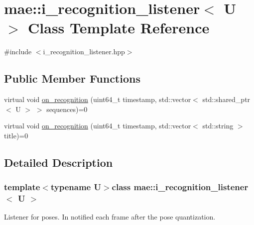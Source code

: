 \hypertarget{classmae_1_1i__recognition__listener}{\section{mae\-:\-:i\-\_\-recognition\-\_\-listener$<$ U $>$ Class Template Reference}
\label{classmae_1_1i__recognition__listener}
}


{\ttfamily \#include $<$i\-\_\-recognition\-\_\-listener.\-hpp$>$}

\subsection*{Public Member Functions}
\begin{DoxyCompactItemize}
\item 
virtual void \hyperlink{classmae_1_1i__recognition__listener_ace61997e2a43a260662c817674650a4a}{on\-\_\-recognition} (uint64\-\_\-t timestamp, std\-::vector$<$ std\-::shared\-\_\-ptr$<$ U $>$ $>$ sequences)=0
\item 
virtual void \hyperlink{classmae_1_1i__recognition__listener_a5f3d301a8a891363a24508448c5c5d1b}{on\-\_\-recognition} (uint64\-\_\-t timestamp, std\-::vector$<$ std\-::string $>$ title)=0
\end{DoxyCompactItemize}


\subsection{Detailed Description}
\subsubsection*{template$<$typename U$>$class mae\-::i\-\_\-recognition\-\_\-listener$<$ U $>$}

Listener for poses. In notified each frame after the pose quantization. 


